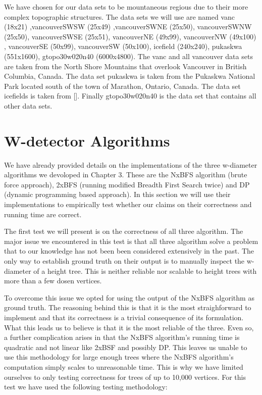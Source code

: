 We have chosen for our data sets to be mountaneous regious due to their more complex topographic structures. The data sets we will use are named vanc (18x21) ,vancouverSWSW (25x49) ,vancouverSWNE (25x50), vancouverSWNW (25x50), vancouverSWSE (25x51), vancouverNE (49x99), vancouverNW (49x100) , vancouverSE (50x99), vancouverSW (50x100), icefield (240x240), pukaskwa (551x1600), gtopo30w020n40 (6000x4800). The vanc and all vancouver data sets are taken from the North Shore Mountains that overlook Vancouver in British Columbia, Canada. The data set pukaskwa is taken from the Pukaskwa National Park located south of the town of Marathon, Ontario, Canada. The data set icefields is taken from []. Finally gtopo30w020n40 is the data set that contains all other data sets.

\section{W-detector Algorithms}

We have already provided details on the implementations of the three w-diameter algorithms we devoloped in Chapter 3. These are the NxBFS algorithm (brute force approach), 2xBFS (running modified Breadth First Search twice) and DP (dynamic programming based approach). In this section we will use their implementations to empirically test whether our claims on their correctness and running time are correct.

The first test we will present is on the correctness of all three algorithm. The major issue we encountered in this test is that all three algorithm solve a problem that to our knowledge has not been been considered extensively in the past. The only way to establish ground truth on their output is to manually inspect the w-diameter of a height tree. This is neither reliable nor scalable to height trees with more than a few dosen vertices.

To overcome this issue we opted for using the output of the NxBFS algorithm as ground truth. The reasoning behind this is that it is the most straighforward to implement and that its correctness is a trivial consequence of its formulation. What this leads us to believe is that it is the most reliable of the three. Even so, a further complication arises in that the NxBFS algorithm's running time is quadratic and not linear like 2xBSF and possibly DP. This leaves us unable to use this methodology for large enough trees where the NxBFS algorithm's computation simply scales to unreasonable time. This is why we have limited ourselves to only testing correctness for trees of up to 10,000 vertices. For this test we have used the following testing methodology:

